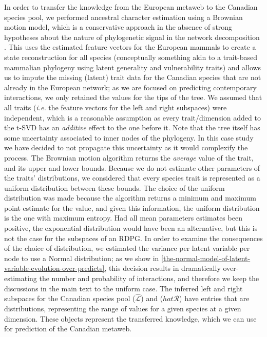 In order to transfer the knowledge from the European metaweb to the
Canadian species pool, we performed ancestral character estimation using
a Brownian motion model, which is a conservative approach in the absence
of strong hypotheses about the nature of phylogenetic signal in the
network decomposition \cite{Litsios2012EffPhy}. This uses the estimated
feature vectors for the European mammals to create a state
reconstruction for all species (conceptually something akin to a
trait-based mammalian phylogeny using latent generality and
vulnerability traits) and allows us to impute the missing (latent) trait
data for the Canadian species that are not already in the European
network; as we are focused on predicting contemporary interactions, we
only retained the values for the tips of the tree. We assumed that all
traits (\emph{i.e.} the feature vectors for the left and right
subspaces) were independent, which is a reasonable assumption as every
trait/dimension added to the t-SVD has an \emph{additive} effect to the
one before it. Note that the \cite{Upham2019InfMam} tree itself has some
uncertainty associated to inner nodes of the phylogeny. In this case
study we have decided to not propagate this uncertainty as it would
complexify the process. The Brownian motion algorithm returns the
\emph{average} value of the trait, and its upper and lower bounds.
Because we do not estimate other parameters of the traits'
distributions, we considered that every species trait is represented as
a uniform distribution between these bounds. The choice of the uniform
distribution was made because the algorithm returns a minimum and
maximum point estimate for the value, and given this information, the
uniform distribution is the one with maximum entropy. Had all mean
parameters estimates been positive, the exponential distribution would
have been an alternative, but this is not the case for the subspaces of
an RDPG. In order to examine the consequences of the choice of
distribution, we estimated the variance per latent variable per node to
use a Normal distribution; as we show in \autoref{the-normal-model-of-latent-variable-evolution-over-predicts}, this decision
results in dramatically over-estimating the number and probability of
interactions, and therefore we keep the discussions in the main text to
the uniform case. The inferred left and right subspaces for the Canadian
species pool ($\hat{\mathscr{L}}$) and ($hat{\mathscr{R}}$) have
entries that are distributions, representing the range of values for a
given species at a given dimension. These objects represent the
transferred knowledge, which we can use for prediction of the Canadian
metaweb.

